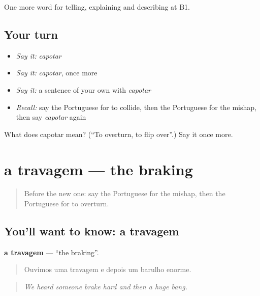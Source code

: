 \begin{grammarlens}[title={What you've built}]
One more word for telling, explaining and describing at B1.
\end{grammarlens}

\subsection*{Your turn}
\begin{itemize}
\raggedright
  \item \emph{Say it:} \emph{capotar}
  \item \emph{Say it:} \emph{capotar}, once more
  \item \emph{Say it:} a sentence of your own with \emph{capotar}
  \item \emph{Recall:} say the Portuguese for to collide, then the Portuguese for the mishap, then say \emph{capotar} again
\end{itemize}

\begin{tcolorbox}[breakable,colback=teal!4,colframe=teal!35!black,title={Before you move on}]
What does capotar mean? (\textquotedblleft{}To overturn, to flip over\textquotedblright{}.) Say it once more.
\end{tcolorbox}
\section[a travagem]{a travagem — the braking}

\label{lesson:PT-C300-travagem}



\begin{quote}
Before the new one: say the Portuguese for the mishap, then the Portuguese for to overturn.
\end{quote}

\subsection*{You'll want to know: a travagem}
\textbf{a travagem} — \textquotedblleft{}the braking\textquotedblright{}.

\begin{quote}
Ouvimos uma travagem e depois um barulho enorme.
\end{quote}

\begin{quote}
\emph{We heard someone brake hard and then a huge bang.}
\end{quote}

